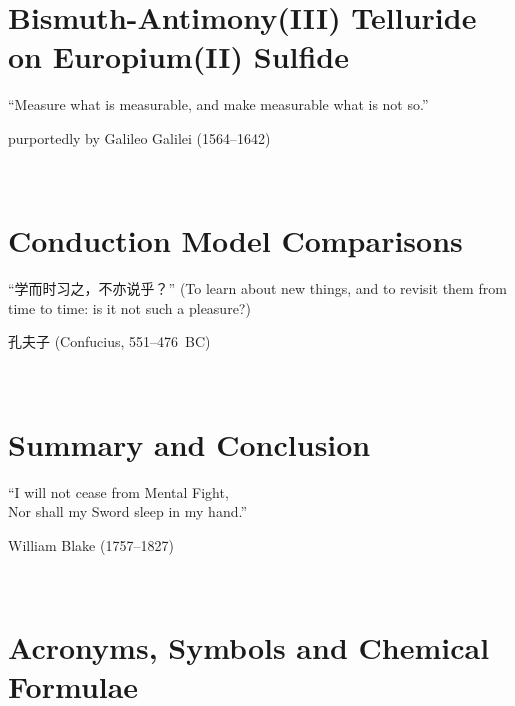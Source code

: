 ﻿\documentclass{report}
\begin{document}
\chapter{Bismuth-Antimony(III) Telluride on Europium(II) Sulfide}\label{ch:bilayer2018}
\begin{refsection}
\epigraph{``Measure what is measurable, and make measurable what is not so.''}{purportedly by Galileo Galilei (1564--1642)}~\\
    
    \printbibliography[heading=subbibintoc, title=References for Chapter~\thechapter]
\end{refsection}

\chapter{Conduction Model Comparisons}\label{ch:models}
\begin{refsection}
    \begin{CJK*}{UTF8}{gkai}
    \epigraph{``学而时习之，不亦说乎？'' (To learn about new things, and to revisit them from time to time: is it not such a pleasure?)}{孔夫子 (Confucius, 551--476~BC)}~\\
    \end{CJK*}
    
    \printbibliography[heading=subbibintoc, title=References for Chapter~\thechapter]
\end{refsection}

\chapter{Summary and Conclusion}\label{ch:conclusion}
\epigraph{``I will not cease from Mental Fight,\\Nor shall my Sword sleep in my hand.''}{William Blake (1757--1827)}~\\
    
    \printbibliography[heading=subbibintoc, title=References for Chapter~\thechapter]
\appendix
%
%
\chapter{Acronyms, Symbols and Chemical Formulae}
    
\end{document}

